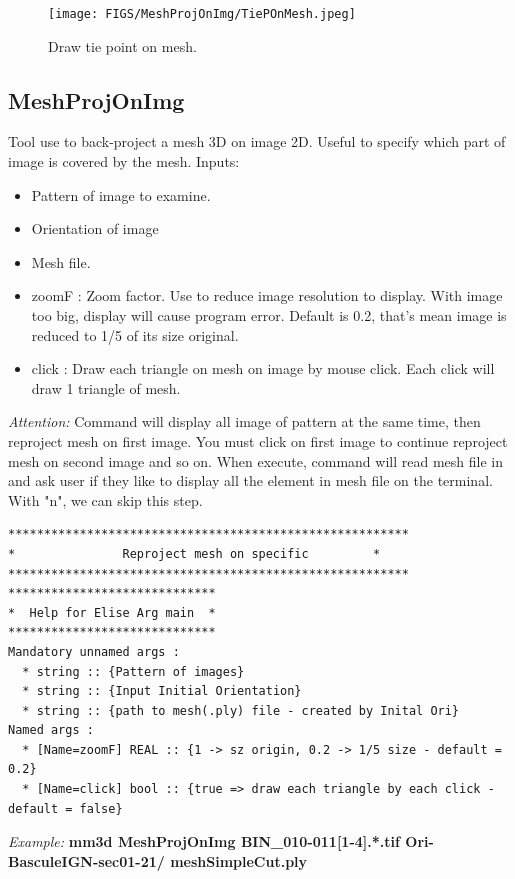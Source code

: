 \begin{figure}[H]
\centering
\texttt{[image: FIGS/MeshProjOnImg/TiePOnMesh.jpeg]}
\caption{Draw tie point on mesh.}
\label{SurfCorr}
\end{figure}


\subsection{MeshProjOnImg}
Tool use to back-project a mesh 3D on image 2D. Useful to specify which part of image is covered by the mesh.
Inputs:
\begin{itemize}
\item Pattern of image to examine.
\item Orientation of image
\item Mesh file.

\item zoomF : Zoom factor. Use to reduce image resolution to display. With image too big, display will cause program error. Default is 0.2, that's mean image is reduced to 1/5 of its size original.
\item click : Draw each triangle on mesh on image by mouse click. Each click will draw 1 triangle of mesh.
\end{itemize}
\textit{Attention:} Command will display all image of pattern at the same time, then reproject mesh on first image. You must click on first image to continue reproject mesh on second image and so on. When execute, command will read mesh file in and ask user if they like to display all the element in mesh file on the terminal. With "n", we can skip this step.

\begin{verbatim}
********************************************************
*               Reproject mesh on specific 	       *
********************************************************
*****************************
*  Help for Elise Arg main  *
*****************************
Mandatory unnamed args : 
  * string :: {Pattern of images}
  * string :: {Input Initial Orientation}
  * string :: {path to mesh(.ply) file - created by Inital Ori}
Named args : 
  * [Name=zoomF] REAL :: {1 -> sz origin, 0.2 -> 1/5 size - default = 0.2}
  * [Name=click] bool :: {true => draw each triangle by each click - default = false}
\end{verbatim}
\textit{Example:}
\textbf{mm3d MeshProjOnImg BIN\_010-011[1-4].*.tif Ori-BasculeIGN-sec01-21/ meshSimpleCut.ply}


